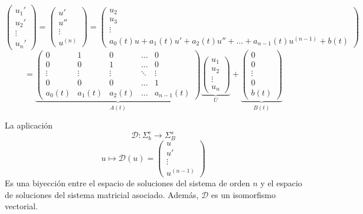 \[
    \begin{pmatrix}
        u_1' \\
        u_2' \\
        \vdots \\
        u_n'
    \end{pmatrix} = \begin{pmatrix}
        u' \\
        u'' \\
        \vdots \\
        u^{(n)}
    \end{pmatrix} = \begin{pmatrix}
        u_2 \\
        u_3 \\
        \vdots \\
        a_0(t) u + a_1(t) u' + a_2(t) u'' + \ldots + a_{n-1}(t) u^{(n-1)} + b(t)
    \end{pmatrix}  
\]  
\[
    = \underbrace{\begin{pmatrix}
        0 & 1 & 0 & \ldots & 0 \\
        0 & 0 & 1 & \ldots & 0 \\
        \vdots & \vdots & \vdots & \ddots & \vdots \\
        0 & 0 & 0 & \ldots & 1 \\
        a_0(t) & a_1(t) & a_2(t) & \ldots & a_{n-1}(t)
    \end{pmatrix}}_{A(t)} \underbrace{\begin{pmatrix}
        u_1 \\
        u_2 \\
        \vdots \\
        u_n
    \end{pmatrix}}_{U} + \underbrace{\begin{pmatrix}
        0 \\
        0 \\
        \vdots \\
        0 \\
        b(t)
    \end{pmatrix}}_{B(t)}
\]

\begin{lema}
    La aplicación 
    \[
        \mathcal{D} : \Sigma_b^e \to \Sigma_B^s
    \]
    \[
        u \mapsto \mathcal{D}(u) = \begin{pmatrix}
            u \\
            u' \\
            \vdots \\
            u^{(n-1)}
        \end{pmatrix}
    \]
    Es una biyección entre el espacio de soluciones del sistema de orden $n$ y el espacio de soluciones del sistema matricial asociado. Además, $\mathcal{D}$ es un isomorfismo vectorial.
\end{lema}

